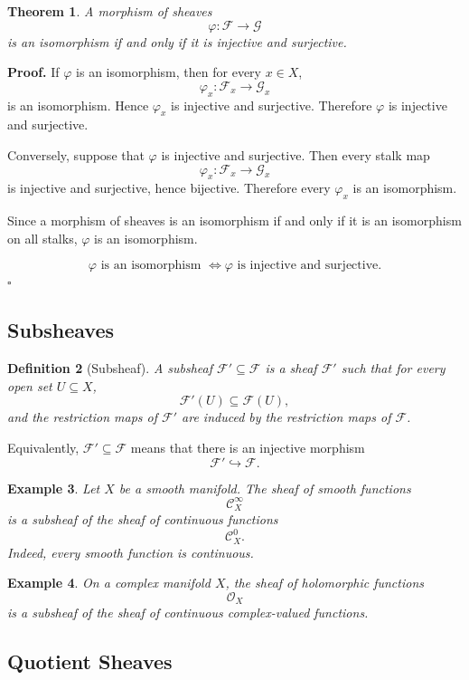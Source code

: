 \documentclass[12pt,a4paper]{article}
\newcommand{\F}{\mathcal F}
\newcommand{\G}{\mathcal G}
\theoremstyle{notespace}
\newtheorem{definition}{Definition}[subsection]
\newtheorem{theorem}[definition]{Theorem}
\newtheorem{example}[definition]{Example}
\newcommand{\Fp}{\mathcal F'}      %
\begin{document}
\begin{theorem}
	A morphism of sheaves
	\[
	\varphi:\F\to \G
	\]
	is an isomorphism if and only if it is injective and surjective.
\end{theorem}

\textbf{Proof.}
If \(\varphi\) is an isomorphism, then for every \(x\in X\),
\[
\varphi_x:\F_x\to \G_x
\]
is an isomorphism. Hence \(\varphi_x\) is injective and surjective. Therefore \(\varphi\) is injective and surjective.

Conversely, suppose that \(\varphi\) is injective and surjective. Then every stalk map
\[
\varphi_x:\F_x\to \G_x
\]
is injective and surjective, hence bijective. Therefore every \(\varphi_x\) is an isomorphism.

Since a morphism of sheaves is an isomorphism if and only if it is an isomorphism on all stalks, \(\varphi\) is an isomorphism.

\[
\boxed{
	\varphi\text{ is an isomorphism }
	\Longleftrightarrow
	\varphi\text{ is injective and surjective.}
}
\]
\(\square\)

\subsection{Subsheaves}

\begin{definition}[Subsheaf]
	A subsheaf \(\Fp\subseteq \F\) is a sheaf \(\Fp\) such that for every open set \(U\subseteq X\),
	\[
	\Fp(U)\subseteq \F(U),
	\]
	and the restriction maps of \(\Fp\) are induced by the restriction maps of \(\F\).
\end{definition}

Equivalently, \(\Fp\subseteq \F\) means that there is an injective morphism
\[
\Fp\hookrightarrow \F.
\]

\begin{example}
	Let \(X\) be a smooth manifold. The sheaf of smooth functions
	\[
	\mathcal C^\infty_X
	\]
	is a subsheaf of the sheaf of continuous functions
	\[
	\mathcal C^0_X.
	\]
	Indeed, every smooth function is continuous.
\end{example}

\begin{example}
	On a complex manifold \(X\), the sheaf of holomorphic functions
	\[
	\mathcal O_X
	\]
	is a subsheaf of the sheaf of continuous complex-valued functions.
\end{example}

\subsection{Quotient Sheaves}
\end{document}
